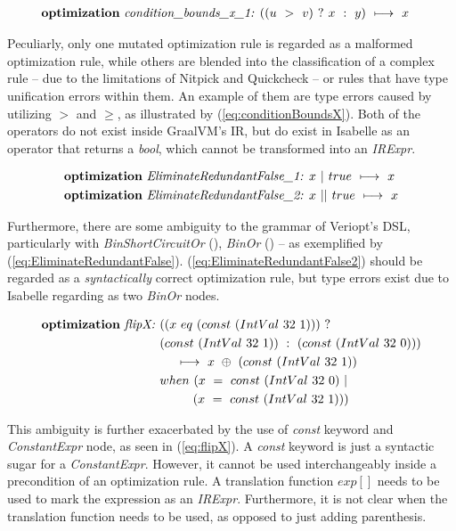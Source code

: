 \begin{align}
    &\text{\textbf{optimization} \emph{condition\_bounds\_x\_1: \(((u~>~v)~?~x~:~y)~\longmapsto~x\)}} \label{eq:conditionBoundsX}
\end{align}

Peculiarly, only one mutated optimization rule is regarded as a malformed optimization rule, while others are blended into the classification 
of a complex rule -- due to the limitations of Nitpick and Quickcheck -- or rules that have type unification errors within them. An example of 
them are type errors caused by utilizing \(>\) and \(\ge\), as illustrated by (\ref{eq:conditionBoundsX}). Both of the operators do not exist 
inside GraalVM's IR, but do exist in Isabelle as an operator that returns a \emph{bool}, which cannot be transformed into an \emph{IRExpr}.

\begin{align}
    &\text{\textbf{optimization} \emph{EliminateRedundantFalse\_1: \(x~|~true~\longmapsto~x\)}} \label{eq:EliminateRedundantFalse} \\
    &\text{\textbf{optimization} \emph{EliminateRedundantFalse\_2: \(x~||~true~\longmapsto~x\)}} \label{eq:EliminateRedundantFalse2}
\end{align}

Furthermore, there are some ambiguity to the grammar of Veriopt's DSL, particularly with \emph{BinShortCircuitOr} (\mono{||}), 
\emph{BinOr} (\mono{|}) -- as exemplified by (\ref{eq:EliminateRedundantFalse}). (\ref{eq:EliminateRedundantFalse2}) should be regarded as 
a \emph{syntactically} correct optimization rule, but type errors exist due to Isabelle regarding \mono{||} as two \emph{BinOr} nodes.

\begin{align}
    \text{\textbf{optimization} \emph{flipX: }} &((x~eq~(const~(IntVal~32~1)))~? \label{eq:flipX} \\
    &(const~(IntVal~32~1))~:~(const~(IntVal~32~0))) \nonumber \\
    &~~~~\longmapsto~x~\oplus~(const~(IntVal~32~1)) \nonumber \\
                            &when~(x~=~const~(IntVal~32~0)~| \nonumber \\
                            &~~~~~~~~(x~=~const~(IntVal~32~1))) \nonumber
\end{align}

This ambiguity is further exacerbated by the use of \emph{const} keyword and \emph{ConstantExpr} node, as seen in (\ref{eq:flipX}). 
A \emph{const} keyword is just a syntactic sugar for a \emph{ConstantExpr}. However, it cannot be used interchangeably inside 
a precondition of an optimization rule. A translation function \(exp[]\) needs to be used to mark the expression as an \emph{IRExpr}.
Furthermore, it is not clear when the translation function needs to be used, as opposed to just adding parenthesis.

